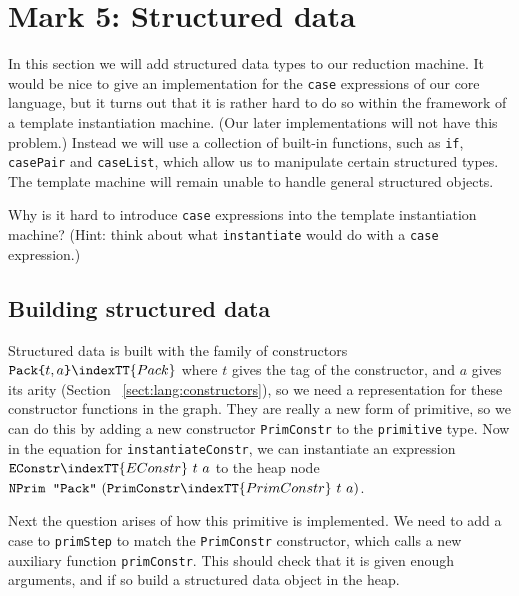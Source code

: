 \section{Mark 5: Structured data}
\label{sect:templ:tidata}

In this section we will add structured
data types to our reduction machine.
It would be nice to give an implementation for the \mbox{\tt case} expressions
of our core language, but it turns out that it is rather hard to do
so within the framework of a template instantiation machine.
(Our later implementations will not have this problem.)
Instead we will use a collection of built-in
functions, such as \mbox{\tt if}, \mbox{\tt casePair} and
\mbox{\tt caseList}, which allow us to manipulate certain structured types.  The
template machine will remain unable to handle general structured objects.

\begin{exercise}
Why is it hard to introduce \mbox{\tt case} expressions into the template instantiation
machine?  (Hint: think about what \mbox{\tt instantiate} would do with a
\mbox{\tt case} expression.)
\end{exercise}

\subsection{Building structured data}

Structured data is built with the family of constructors $\mbox{\tt Pack{\char'173}}t,a\mbox{\tt {\char'175}}\indexTT{Pack}$
where $t$ gives the tag of the constructor, and $a$
gives its arity
(Section ~\ref{sect:lang:constructors}),
so we need a representation
for these constructor functions in the graph.
They are really a new form of primitive, so we can do this by adding
a new constructor \mbox{\tt PrimConstr} to the \mbox{\tt primitive} type.
Now in the equation for \mbox{\tt instantiateConstr}, we can instantiate an
expression $\mbox{\tt EConstr}\indexTT{EConstr}~ t~ a$ to the heap node
$\mbox{\tt NPrim\ "Pack"}~ (\mbox{\tt PrimConstr}\indexTT{PrimConstr}~ t~ a)$.

Next the question arises of how this primitive is implemented.  We need
to add a case to \mbox{\tt primStep} to match the \mbox{\tt PrimConstr} constructor,
which calls a new auxiliary function \mbox{\tt primConstr}.
This should check that it is given enough arguments, and if so build
a structured data object in the heap.

